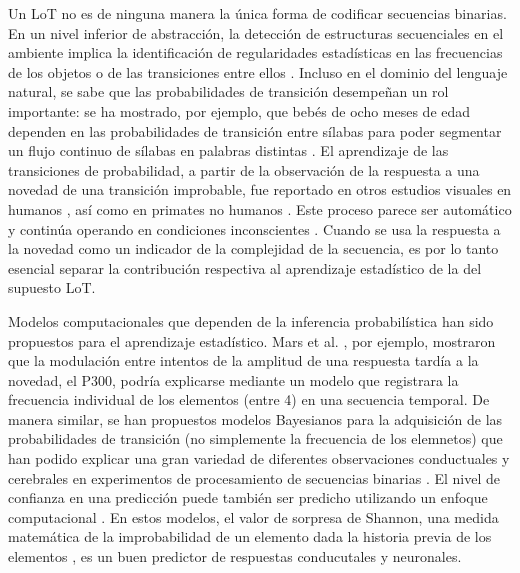Un LoT no es de ninguna manera la única forma de codificar secuencias binarias. En un nivel inferior de abstracción, la detección de estructuras secuenciales en el ambiente implica la identificación de regularidades estadísticas en las frecuencias de los objetos o de las transiciones entre ellos \cite{f4,f20}. Incluso en el dominio del lenguaje natural, se sabe que las probabilidades de transición desempeñan un rol importante: se ha mostrado, por ejemplo, que bebés de ocho meses de edad dependen en las probabilidades de transición entre sílabas para poder segmentar un flujo continuo de sílabas en palabras distintas \cite{f73,f74}. El aprendizaje de las transiciones de probabilidad, a partir de la observación de la respuesta a una novedad de una transición improbable, fue reportado en otros estudios visuales en humanos \cite{f75,f76}, así como en primates no humanos \cite{f77,f78}. Este proceso parece ser automático y continúa operando en condiciones inconscientes \cite{f67,f71,f72}. Cuando se usa la respuesta a la novedad como un indicador de la complejidad de la secuencia, es por lo tanto esencial separar la contribución respectiva al aprendizaje estadístico de la del supuesto LoT.


Modelos computacionales que dependen de la inferencia probabilística han sido propuestos para el aprendizaje estadístico. Mars et al. \cite{f79}, por ejemplo, mostraron que la modulación entre intentos de la amplitud de una respuesta tardía a la novedad, el P300, podría explicarse mediante un modelo que registrara la frecuencia individual de los elementos (entre 4) en una secuencia temporal. De manera similar, se han propuestos modelos Bayesianos para la adquisición de las probabilidades de transición (no simplemente la frecuencia de los elemnetos) que han podido explicar una gran variedad de diferentes observaciones conductuales y cerebrales en experimentos de procesamiento de secuencias binarias \cite{f20,f21}. El nivel de confianza en una predicción puede también ser predicho utilizando un enfoque computacional \cite{f80,f81}. En estos modelos, el valor de sorpresa de Shannon, una medida matemática de la improbabilidad de un elemento dada la historia previa de los elementos \cite{f82,shannon48,f84}, es un buen predictor de respuestas conducutales y neuronales.

